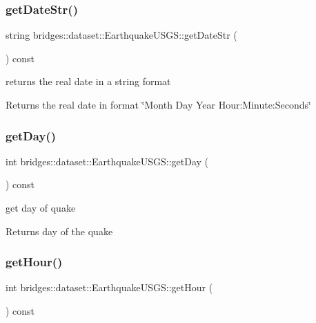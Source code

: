 \subsubsection{\texorpdfstring{getDateStr()}{getDateStr()}}
{\footnotesize\ttfamily string bridges\+::dataset\+::\+Earthquake\+U\+S\+G\+S\+::get\+Date\+Str (\begin{DoxyParamCaption}{ }\end{DoxyParamCaption}) const\hspace{0.3cm}{\ttfamily [inline]}}



returns the real date in a string format 

\begin{DoxyReturn}{Returns}
the real date in format \char`\"{}\+Month Day Year Hour\+:\+Minute\+:\+Seconds\char`\"{} 
\end{DoxyReturn}
\mbox{\label{classbridges_1_1dataset_1_1_earthquake_u_s_g_s_a6052793e29a4d9708ebf35cb8477ed0d}} 
\subsubsection{\texorpdfstring{getDay()}{getDay()}}
{\footnotesize\ttfamily int bridges\+::dataset\+::\+Earthquake\+U\+S\+G\+S\+::get\+Day (\begin{DoxyParamCaption}{ }\end{DoxyParamCaption}) const\hspace{0.3cm}{\ttfamily [inline]}}



get day of quake 

\begin{DoxyReturn}{Returns}
day of the quake 
\end{DoxyReturn}
\mbox{\label{classbridges_1_1dataset_1_1_earthquake_u_s_g_s_a43e64f31d62d11ad554be5f5388720f6}} 
\subsubsection{\texorpdfstring{getHour()}{getHour()}}
{\footnotesize\ttfamily int bridges\+::dataset\+::\+Earthquake\+U\+S\+G\+S\+::get\+Hour (\begin{DoxyParamCaption}{ }\end{DoxyParamCaption}) const\hspace{0.3cm}{\ttfamily [inline]}}



